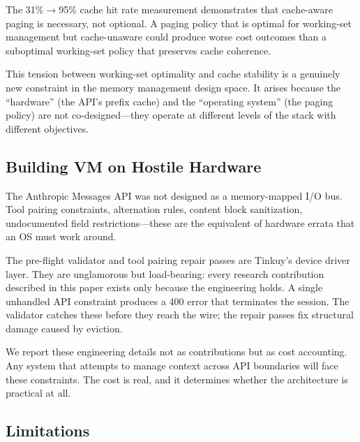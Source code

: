 \documentclass[sigplan,screen,anonymous]{acmart}
\begin{document}
The 31\%$\to$95\% cache hit rate measurement demonstrates that
cache-aware paging is necessary, not optional. A paging policy that
is optimal for working-set management but cache-unaware could
produce worse cost outcomes than a suboptimal working-set policy that
preserves cache coherence.

This tension between working-set optimality and cache stability is
a genuinely new constraint in the memory management design space. It
arises because the ``hardware'' (the API's prefix cache) and the
``operating system'' (the paging policy) are not co-designed---they
operate at different levels of the stack with different objectives.

\subsection{Building VM on Hostile Hardware}

The Anthropic Messages API was not designed as a memory-mapped I/O
bus. Tool pairing constraints, alternation rules, content block
sanitization, undocumented field restrictions---these are the
equivalent of hardware errata that an OS must work around.

The pre-flight validator and tool pairing repair passes are Tinkuy's
device driver layer. They are unglamorous but load-bearing: every
research contribution described in this paper exists only because the
engineering holds. A single unhandled API constraint produces a 400
error that terminates the session. The validator catches these before
they reach the wire; the repair passes fix structural damage caused
by eviction.

We report these engineering details not as contributions but as cost
accounting. Any system that attempts to manage context across API
boundaries will face these constraints. The cost is real, and it
determines whether the architecture is practical at all.

\subsection{Limitations}
\end{document}
